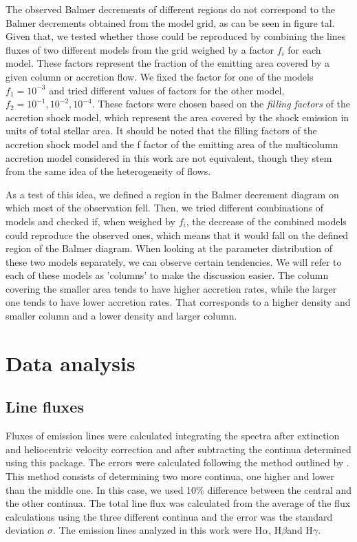 \documentclass[twocolumn,linenumbers]{aastex631}
\newcommand{\halpha}{H$\alpha$}
\newcommand{\hbeta}{H$\beta$}
\newcommand{\hgamma}{H$\gamma$}
\begin{document}
The observed Balmer decrements of different regions do not correspond to the Balmer decrements obtained from the model grid, as can be seen in figure tal. Given that, we tested whether those could be reproduced by combining the lines fluxes of two different models from the grid weighed by a factor $f_i$ for each model. These factors represent the fraction of the emitting area covered by a given column or accretion flow. We fixed the factor for one of the models $f_1=10^{-3}$ and tried different values of factors for the other model, $f_2 = 10^{-1},10^{-2},10^{-4}$. These factors were chosen based on the \textit{filling factors} of the accretion shock model, which represent the area covered by the shock emission in units of total stellar area. It should be noted that the filling factors of the accretion shock model and the f factor of the emitting area of the multicolumn accretion model considered in this work are not equivalent, though they stem from the same idea of the heterogeneity of flows. 

As a test of this idea, we defined a region in the Balmer decrement diagram on which most of the observation fell. Then, we tried different combinations of models and checked if, when weighed by $f_i$, the decrease of the combined models could reproduce the observed ones, which means that it would fall on the defined region of the Balmer diagram. When looking at the parameter distribution of these two models separately, we can observe certain tendencies. We will refer to each of these models as 'columns' to make the discussion easier. The column covering the smaller area tends to have higher accretion rates, while the larger one tends to have lower accretion rates. That corresponds to a higher density and smaller column and a lower density and larger column.

\section{Data analysis}

\subsection{Line fluxes}

Fluxes of emission lines were calculated integrating the spectra after extinction and heliocentric velocity correction and after subtracting the continua determined using this package. The errors were calculated following the method outlined by \citet{alcala2014}. This method consists of determining two more continua, one higher and lower than the middle one. In this case, we used 10\% difference between the central and the other continua. The total line flux was calculated from the average of the flux calculations using the three different continua and the error was the standard deviation $\sigma$. The emission lines analyzed in this work were \halpha, \hbeta and \hgamma.
\end{document}
